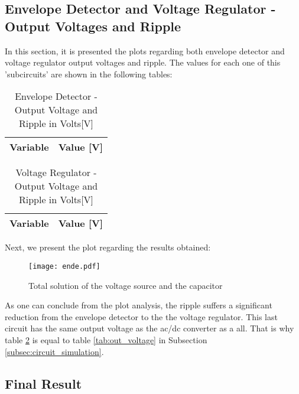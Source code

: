 \newpage
\subsection{Envelope Detector and Voltage Regulator - Output Voltages and Ripple}

\par In this section, it is presented the plots regarding both envelope detector and voltage regulator output voltages and ripple.
The values for each one of this 'subcircuits' are shown in the following tables:

\begin{table}[H]
  \centering
  \begin{tabular}{|l|r|}
    \hline    
    {\bf Variable} & {\bf Value [V]} \\ \hline
    
  \end{tabular}
  \caption{Envelope Detector - Output Voltage and Ripple in Volts[V]}
  \label{tab:out_env}
\end{table}

\begin{table}[H]
  \centering
  \begin{tabular}{|l|r|}
    \hline    
    {\bf Variable} & {\bf Value [V]} \\ \hline
    
  \end{tabular}
  \caption{Voltage Regulator - Output Voltage and Ripple in Volts[V]}
  \label{tab:out_voltage2}
\end{table}


Next, we present the plot regarding the results obtained:

\begin{figure}[H] \centering
\texttt{[image: ende.pdf]}
\caption{Total solution of the voltage source and the capacitor}
\label{fig:env+vore}
\end{figure}


As one can conclude from the plot analysis, the ripple suffers a significant reduction from the envelope detector to the the voltage regulator. This last circuit has the same output voltage as the ac/dc converter as a all. That is why table \ref{tab:out_voltage2} is equal to table \ref{tab:out_voltage} in Subsection \ref{subsec:circuit_simulation}.



\subsection{Final Result}

